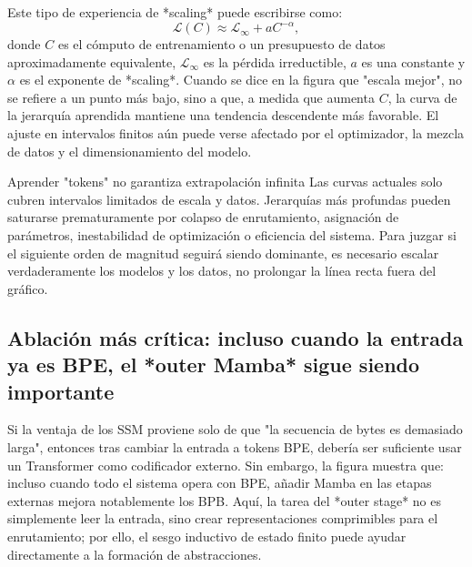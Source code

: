 Este tipo de experiencia de *scaling* puede escribirse como:
\[
\mathcal{L}(C)\approx \mathcal{L}_\infty + aC^{-\alpha},
\]
donde $C$ es el cómputo de entrenamiento o un presupuesto de datos aproximadamente equivalente, $\mathcal{L}_\infty$ es la pérdida irreductible, $a$ es una constante y $\alpha$ es el exponente de *scaling*. Cuando se dice en la figura que "escala mejor", no se refiere a un punto más bajo, sino a que, a medida que aumenta $C$, la curva de la jerarquía aprendida mantiene una tendencia descendente más favorable. El ajuste en intervalos finitos aún puede verse afectado por el optimizador, la mezcla de datos y el dimensionamiento del modelo.


\begin{warningbox}{Aprender "tokens" no garantiza extrapolación infinita}
Las curvas actuales solo cubren intervalos limitados de escala y datos. Jerarquías más profundas pueden saturarse prematuramente por colapso de enrutamiento, asignación de parámetros, inestabilidad de optimización o eficiencia del sistema. Para juzgar si el siguiente orden de magnitud seguirá siendo dominante, es necesario escalar verdaderamente los modelos y los datos, no prolongar la línea recta fuera del gráfico.
\end{warningbox}

\subsection{Ablación más crítica: incluso cuando la entrada ya es BPE, el *outer Mamba* sigue siendo importante}

Si la ventaja de los SSM proviene solo de que "la secuencia de bytes es demasiado larga", entonces tras cambiar la entrada a tokens BPE, debería ser suficiente usar un Transformer como codificador externo. Sin embargo, la figura muestra que: incluso cuando todo el sistema opera con BPE, añadir Mamba en las etapas externas mejora notablemente los BPB. Aquí, la tarea del *outer stage* no es simplemente leer la entrada, sino crear representaciones comprimibles para el enrutamiento; por ello, el sesgo inductivo de estado finito puede ayudar directamente a la formación de abstracciones.

